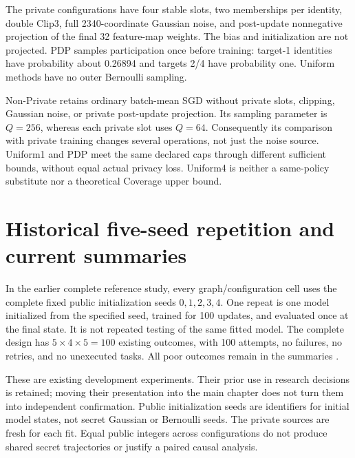 The private configurations have four stable slots, two memberships per identity, double Clip3, full 2340-coordinate Gaussian noise, and post-update nonnegative projection of the final 32 feature-map weights. The bias and initialization are not projected. PDP samples participation once before training: target-1 identities have probability about 0.26894 and targets 2/4 have probability one. Uniform methods have no outer Bernoulli sampling.

Non-Private retains ordinary batch-mean SGD without private slots, clipping, Gaussian noise, or private post-update projection. Its sampling parameter is $Q=256$, whereas each private slot uses $Q=64$. Consequently its comparison with private training changes several operations, not just the noise source. Uniform1 and PDP meet the same declared caps through different sufficient bounds, without equal actual privacy loss. Uniform4 is neither a same-policy substitute nor a theoretical Coverage upper bound.

\section{Historical five-seed repetition and current summaries}
In the earlier complete reference study, every graph/configuration cell uses the complete fixed public initialization seeds $0,1,2,3,4$. One repeat is one model initialized from the specified seed, trained for 100 updates, and evaluated once at the final state. It is not repeated testing of the same fitted model. The complete design has $5\times4\times5=100$ existing outcomes, with 100 attempts, no failures, no retries, and no unexecuted tasks. All poor outcomes remain in the summaries \cite{projectdev}.

These are existing development experiments. Their prior use in research decisions is retained; moving their presentation into the main chapter does not turn them into independent confirmation. Public initialization seeds are identifiers for initial model states, not secret Gaussian or Bernoulli seeds. The private sources are fresh for each fit. Equal public integers across configurations do not produce shared secret trajectories or justify a paired causal analysis.


